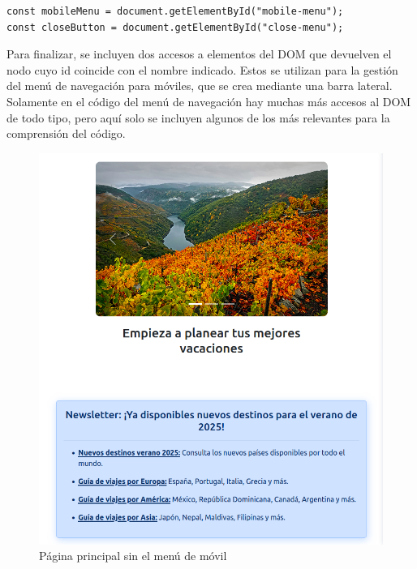 \documentclass[11pt, a4paper]{book}
\begin{document}
	
	\begin{lstlisting}
const mobileMenu = document.getElementById("mobile-menu");
const closeButton = document.getElementById("close-menu");
	\end{lstlisting}

	Para finalizar, se incluyen dos accesos a elementos del DOM que devuelven el nodo cuyo id coincide con el nombre indicado. Estos se utilizan para la gestión del menú de navegación para móviles, que se crea mediante una barra lateral. Solamente en el código del menú de navegación hay muchas más accesos al DOM de todo tipo, pero aquí solo se incluyen algunos de los más relevantes para la comprensión del código.
	
	\begin{figure} [H]
		\centering
		\includegraphics[height=0.4\textheight]{CSS/1-5 768cut.png}
		\caption{Página principal sin el menú de móvil}
	\end{figure}
\end{document}
